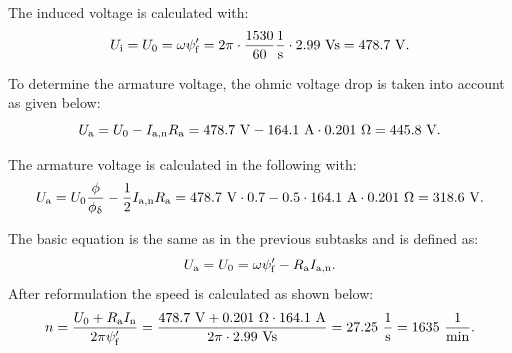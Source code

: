 
\begin{solutionblock}
	The induced voltage is calculated with:
	\begin{equation}
		\Ui = U_{\mathrm{0}}
		= \omega \psi_{\mathrm{f}}'
		= 2 \pi \cdot \frac{1530}{60} \si{\frac{1}{s}} \cdot 2.99 \ \si{Vs}
		= 478.7 \ \si{V}.
	\end{equation}

	To determine the armature voltage, the ohmic voltage drop is taken into account as given below:
	\begin{equation}
		U_{\mathrm{a}} = U_{\mathrm{0}} - I_{\mathrm{a,n}} \Ra
		= 478.7 \ \si{V} - 164.1 \ \si{A} \cdot 0.201 \ \si{\Omega}
		= 445.8 \ \si{V}.
	\end{equation}
\end{solutionblock}


\begin{solutionblock}
	The armature voltage is calculated in the following with:
	\begin{equation}
		U_{\mathrm{a}} = U_{\mathrm{0}} \frac{\phi}{\phiDelta} - \frac{1}{2} I_{\mathrm{a,n}} \Ra
		= 478.7 \ \si{V} \cdot 0.7 - 0.5 \cdot 164.1 \ \si{A} \cdot 0.201 \ \si{\Omega}
		= 318.6 \ \si{V}.
	\end{equation}
\end{solutionblock}


\begin{solutionblock}
	The basic equation is the same as in the previous subtasks and is defined as:
	\begin{equation}
		\Ua = U_{\mathrm{0}} = \omega \psi_{\mathrm{f}}' - \Ra I_{\mathrm{a,n}}.
	\end{equation}
	After reformulation the speed is calculated as shown below:
	\begin{equation}
		n = \frac{U_{\mathrm{0}} + \Ra \In}{2 \pi \psi_{\mathrm{f}}'}
		= \frac{478.7 \ \si{V} + 0.201 \ \si{\Omega} \cdot 164.1 \ \si{A}}{2 \pi \cdot 2.99 \ \si{Vs}}
		= 27.25 \ \si{\frac{1}{s}}
		= 1635 \ \si{\frac{1}{min}}.
	\end{equation}
\end{solutionblock}

